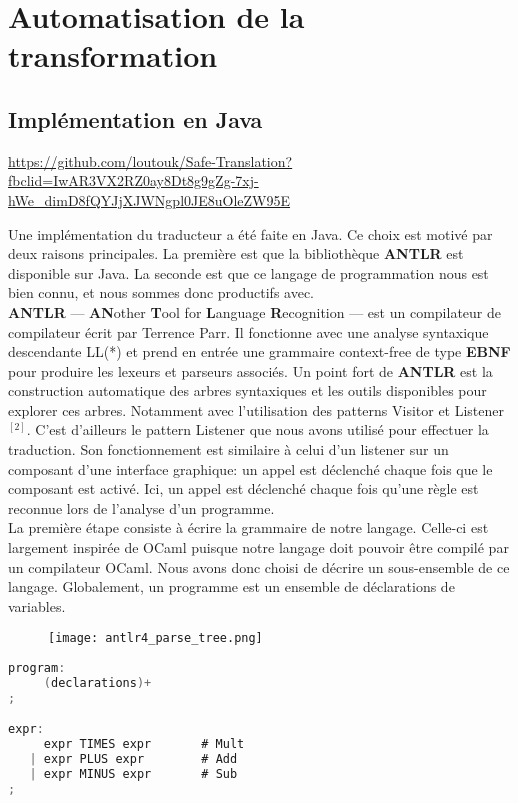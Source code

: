 \documentclass[11pt, a4paper, notitlepage]{article}
\newcommand\tab{{\hspace*{12.5mm}}}
\begin{document}
\section{Automatisation de la transformation}

\subsection{Implémentation en Java}
\begin{center}
   \url{https://github.com/loutouk/Safe-Translation?fbclid=IwAR3VX2RZ0ay8Dt8g9gZg-7xj-hWe_dimD8fQYJjXJWNgpl0JE8uOleZW95E}
\end{center}
\tab Une implémentation du traducteur a été faite en Java. Ce choix est motivé par deux raisons principales. La première est que la bibliothèque \textbf{ANTLR} est disponible sur Java. La seconde est que ce langage de programmation nous est bien connu, et nous sommes donc productifs avec.\\
\tab \textbf{ANTLR} --- \textbf{AN}other \textbf{T}ool for \textbf{L}anguage \textbf{R}ecognition --- est un compilateur de compilateur écrit par Terrence Parr. Il fonctionne avec une analyse syntaxique descendante LL(*) et prend en entrée une grammaire context-free de type \textbf{EBNF} pour produire les lexeurs et parseurs associés. Un point fort de \textbf{ANTLR} est la construction automatique des arbres syntaxiques et les outils disponibles pour explorer ces arbres. Notamment avec l'utilisation des patterns Visitor et Listener$^{[2]}$. C'est d'ailleurs le pattern Listener que nous avons utilisé pour effectuer la traduction. Son fonctionnement est similaire à celui d'un listener sur un composant d'une interface graphique: un appel est déclenché chaque fois que le composant est activé. Ici, un appel est déclenché chaque fois qu'une règle est reconnue lors de l'analyse d'un programme.\\
\tab La première étape consiste à écrire la grammaire de notre langage. Celle-ci est largement inspirée de OCaml puisque notre langage doit pouvoir être compilé par un compilateur OCaml. Nous avons donc choisi de décrire un sous-ensemble de ce langage. Globalement, un programme est un ensemble de déclarations de variables.

\begin{figure}[h]
   \centering
   \texttt{[image: antlr4\_parse\_tree.png]}
\end{figure}

\begin{lstlisting}[language=java]
program:
     (declarations)+
;

expr:
     expr TIMES expr       # Mult
   | expr PLUS expr        # Add
   | expr MINUS expr       # Sub
;
\end{lstlisting}
\end{document}
